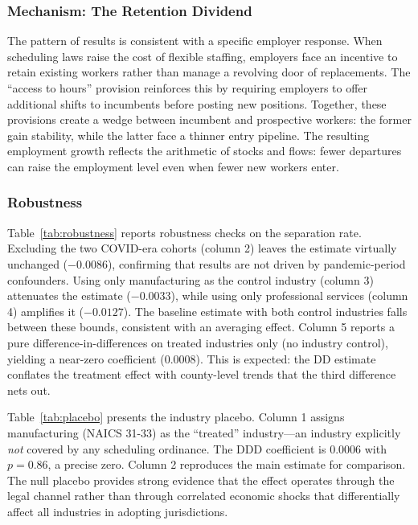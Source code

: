 \documentclass[12pt]{article}
\begin{document}
\subsubsection*{Mechanism: The Retention Dividend} The pattern of results is consistent with a specific employer response. When scheduling laws raise the cost of flexible staffing, employers face an incentive to retain existing workers rather than manage a revolving door of replacements. The ``access to hours'' provision reinforces this by requiring employers to offer additional shifts to incumbents before posting new positions. Together, these provisions create a wedge between incumbent and prospective workers: the former gain stability, while the latter face a thinner entry pipeline. The resulting employment growth reflects the arithmetic of stocks and flows: fewer departures can raise the employment level even when fewer new workers enter.

\subsubsection*{Robustness}



Table~\ref{tab:robustness} reports robustness checks on the separation rate. Excluding the two COVID-era cohorts (column 2) leaves the estimate virtually unchanged ($-0.0086$), confirming that results are not driven by pandemic-period confounders. Using only manufacturing as the control industry (column 3) attenuates the estimate ($-0.0033$), while using only professional services (column 4) amplifies it ($-0.0127$). The baseline estimate with both control industries falls between these bounds, consistent with an averaging effect. Column 5 reports a pure difference-in-differences on treated industries only (no industry control), yielding a near-zero coefficient ($0.0008$). This is expected: the DD estimate conflates the treatment effect with county-level trends that the third difference nets out.



Table~\ref{tab:placebo} presents the industry placebo. Column 1 assigns manufacturing (NAICS 31-33) as the ``treated'' industry---an industry explicitly \emph{not} covered by any scheduling ordinance. The DDD coefficient is 0.0006 with $p = 0.86$, a precise zero. Column 2 reproduces the main estimate for comparison. The null placebo provides strong evidence that the effect operates through the legal channel rather than through correlated economic shocks that differentially affect all industries in adopting jurisdictions.
\end{document}
